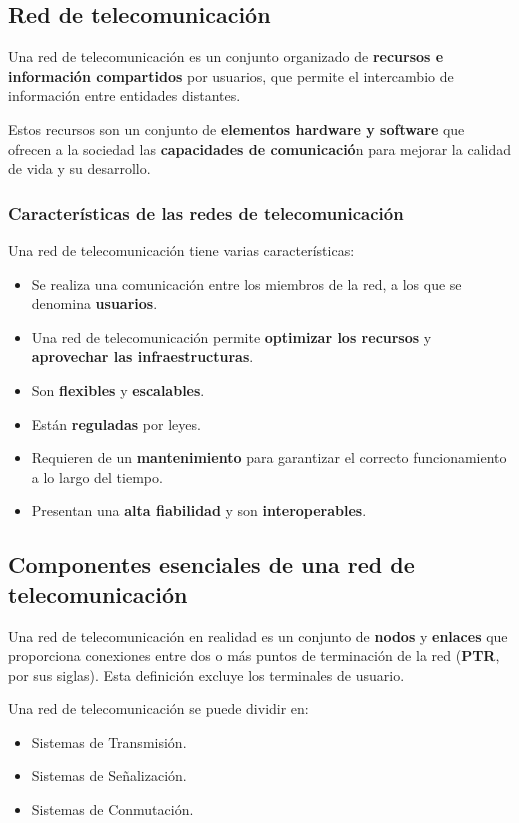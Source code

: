 \documentclass[a4paper]{book}
\numberwithin{figure}{chapter}
\numberwithin{equation}{subsection}
\begin{document}
\subsection{Red de telecomunicación}
Una red de telecomunicación es un conjunto organizado de \textbf{recursos e información compartidos} por usuarios, que permite el intercambio de información entre entidades distantes.

Estos recursos son un conjunto de \textbf{elementos hardware y software} que ofrecen a la sociedad las \textbf{capacidades de comunicació}n para mejorar la calidad de vida y su desarrollo.

\subsubsection{Características de las redes de telecomunicación}
Una red de telecomunicación tiene varias características:
\begin{itemize}
  \item Se realiza una comunicación entre los miembros de la red, a los que se denomina \textbf{usuarios}.
  \item Una red de telecomunicación permite \textbf{optimizar los recursos} y \textbf{aprovechar las infraestructuras}.
  \item Son \textbf{flexibles} y \textbf{escalables}.
  \item Están \textbf{reguladas} por leyes.
  \item Requieren de un \textbf{mantenimiento} para garantizar el correcto funcionamiento a lo largo del tiempo.
  \item Presentan una \textbf{alta fiabilidad} y son \textbf{interoperables}.
\end{itemize}

\subsection{Componentes esenciales de una red de telecomunicación}
Una red de telecomunicación en realidad es un conjunto de \textbf{nodos} y \textbf{enlaces} que proporciona conexiones entre dos o más puntos de terminación de la red (\textbf{PTR}, por sus siglas). Esta definición excluye los terminales de usuario.

Una red de telecomunicación se puede dividir en:
\begin{itemize}
  \item Sistemas de Transmisión.
  \item Sistemas de Señalización.
  \item Sistemas de Conmutación.
\end{itemize}
\end{document}
